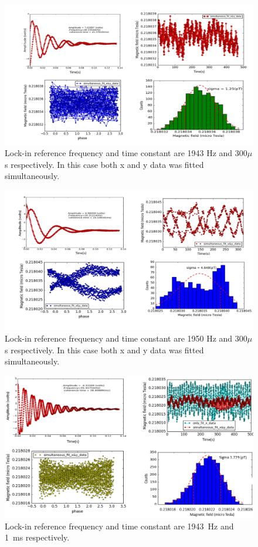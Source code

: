   \begin{figure}[h]
\centering\includegraphics[width=0.8\linewidth]{figures/freq_1943_simultaneous_fit_300microsec_.png}
\caption{Lock-in reference frequency and time constant are 1943 Hz and 300$\mu$s respectively. In this case both x and y data was fitted simultaneously. \label{fig:freq_1943_simultaneous_fit_300_micro_sec}}
\end{figure}

 \begin{figure}[h]
\centering\includegraphics[width=0.8\linewidth]{figures/freq_2015_simultaneous_fit_300microsec.png}
\caption{Lock-in reference frequency and time constant are 1950 Hz and 300$\mu$s respectively. In this case both x and y data was fitted simultaneously. \label{fig:freq_2015_simultaneous_fit_300_micros}}
\end{figure}

  \begin{figure}[h]
\centering\includegraphics[width=0.8\linewidth]{figures/freq_1943_simultaneous_fit_1ms.png}
\caption{Lock-in reference frequency and time constant are 1943~Hz and 1~ms respectively.  \label{fig:freq_1943_simultaneous_fit_1ms}}
\end{figure}

